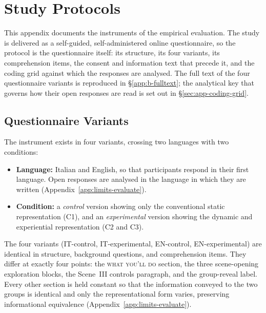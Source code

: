 
\chapter{Study Protocols}
\label{app:protocols}

This appendix documents the instruments of the empirical evaluation. The study is delivered as a self-guided, self-administered online questionnaire, so the protocol is the questionnaire itself: its structure, its four variants, its comprehension items, the consent and information text that precede it, and the coding grid against which the responses are analysed. The full text of the four questionnaire variants is reproduced in \S\ref{app:b-fulltext}; the analytical key that governs how their open responses are read is set out in \S\ref{sec:app-coding-grid}.

\section{Questionnaire Variants}
\label{app:b-variants}

The instrument exists in four variants, crossing two languages with two conditions:

\begin{itemize}
    \item \textbf{Language:} Italian and English, so that participants respond in their first language. Open responses are analysed in the language in which they are written (Appendix~\ref{app:limits-evaluate}).
    \item \textbf{Condition:} a \emph{control} version showing only the conventional static representation (C1), and an \emph{experimental} version showing the dynamic and experiential representation (C2 and C3).
\end{itemize}

\noindent The four variants (IT-control, IT-experimental, EN-control, EN-experimental) are identical in structure, background questions, and comprehension items. They differ at exactly four points: the \textsc{what you'll do} section, the three scene-opening exploration blocks, the Scene~III controls paragraph, and the group-reveal label. Every other section is held constant so that the information conveyed to the two groups is identical and only the representational form varies, preserving informational equivalence \parencite{tversky2002} (Appendix~\ref{app:limits-evaluate}).

